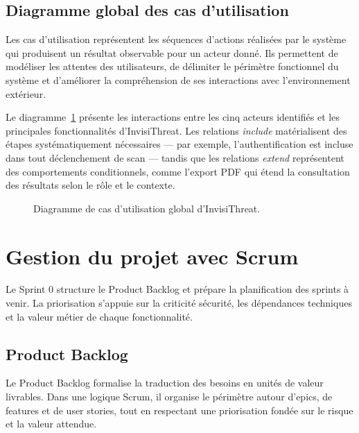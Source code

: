 \subsection{Diagramme global des cas d'utilisation}

Les cas d'utilisation représentent les séquences d'actions réalisées par le système
qui produisent un résultat observable pour un acteur donné. Ils permettent de modéliser
les attentes des utilisateurs, de délimiter le périmètre fonctionnel du système et
d'améliorer la compréhension de ses interactions avec l'environnement extérieur.

Le diagramme~\ref{fig:use-case-global} présente les interactions entre les cinq acteurs
identifiés et les principales fonctionnalités d'InvisiThreat. Les relations
\textit{include} matérialisent des étapes systématiquement nécessaires — par exemple,
l'authentification est incluse dans tout déclenchement de scan — tandis que les
relations \textit{extend} représentent des comportements conditionnels, comme
l'export PDF qui étend la consultation des résultats selon le rôle et le contexte.

\begin{figure}[H]
\centering
\fbox{\rule{0pt}{2in}\rule{0.9\linewidth}{0pt}}
\caption{Diagramme de cas d'utilisation global d'InvisiThreat.}
\label{fig:use-case-global}
\end{figure}

\section{Gestion du projet avec Scrum}

Le Sprint 0 structure le Product Backlog et prépare la planification des sprints
à venir. La priorisation s'appuie sur la criticité sécurité, les dépendances
techniques et la valeur métier de chaque fonctionnalité.

\subsection{Product Backlog}

Le Product Backlog formalise la traduction des besoins en unités de valeur livrables.
Dans une logique Scrum, il organise le périmètre autour d'epics, de features et de
user stories, tout en respectant une priorisation fondée sur le risque et la valeur
attendue.

